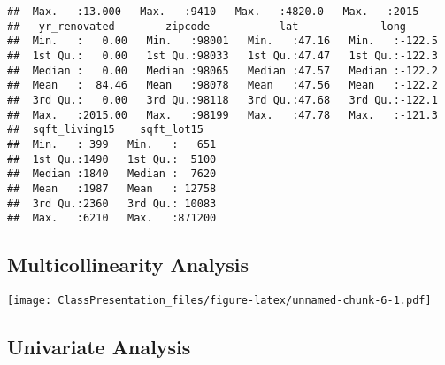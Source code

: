 \documentclass[]{article}
\newenvironment{Shaded}{\begin{snugshade}}{\end{snugshade}}
\newcommand{\CommentTok}[1]{\textcolor[rgb]{0.56,0.35,0.01}{\textit{#1}}}
\newcommand{\DataTypeTok}[1]{\textcolor[rgb]{0.13,0.29,0.53}{#1}}
\newcommand{\DecValTok}[1]{\textcolor[rgb]{0.00,0.00,0.81}{#1}}
\newcommand{\KeywordTok}[1]{\textcolor[rgb]{0.13,0.29,0.53}{\textbf{#1}}}
\newcommand{\NormalTok}[1]{#1}
\newcommand{\OperatorTok}[1]{\textcolor[rgb]{0.81,0.36,0.00}{\textbf{#1}}}
\newcommand{\OtherTok}[1]{\textcolor[rgb]{0.56,0.35,0.01}{#1}}
\newcommand{\StringTok}[1]{\textcolor[rgb]{0.31,0.60,0.02}{#1}}
\begin{document}
\begin{verbatim}
##  Max.   :13.000   Max.   :9410   Max.   :4820.0   Max.   :2015  
##   yr_renovated        zipcode           lat             long       
##  Min.   :   0.00   Min.   :98001   Min.   :47.16   Min.   :-122.5  
##  1st Qu.:   0.00   1st Qu.:98033   1st Qu.:47.47   1st Qu.:-122.3  
##  Median :   0.00   Median :98065   Median :47.57   Median :-122.2  
##  Mean   :  84.46   Mean   :98078   Mean   :47.56   Mean   :-122.2  
##  3rd Qu.:   0.00   3rd Qu.:98118   3rd Qu.:47.68   3rd Qu.:-122.1  
##  Max.   :2015.00   Max.   :98199   Max.   :47.78   Max.   :-121.3  
##  sqft_living15    sqft_lot15    
##  Min.   : 399   Min.   :   651  
##  1st Qu.:1490   1st Qu.:  5100  
##  Median :1840   Median :  7620  
##  Mean   :1987   Mean   : 12758  
##  3rd Qu.:2360   3rd Qu.: 10083  
##  Max.   :6210   Max.   :871200
\end{verbatim}

\hypertarget{multicollinearity-analysis}{%
\subsection{Multicollinearity
Analysis}\label{multicollinearity-analysis}}

\begin{Shaded}
\end{Shaded}

\texttt{[image: ClassPresentation\_files/figure-latex/unnamed-chunk-6-1.pdf]}

\hypertarget{univariate-analysis}{%
\subsection{Univariate Analysis}\label{univariate-analysis}}
\end{document}
